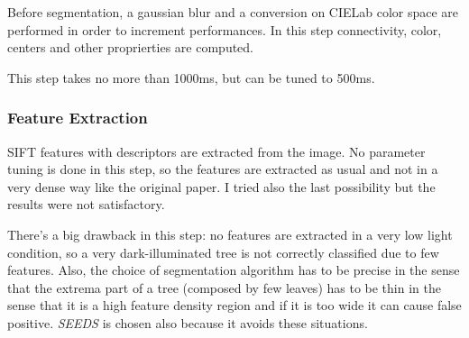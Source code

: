 \documentclass[a4paper,titlepaget]{article}
\begin{document}
Before segmentation, a gaussian blur and a conversion on CIELab color space are performed in order to increment performances. In this step connectivity, color, centers and other proprierties are computed.

This step takes no more than 1000ms, but can be tuned to 500ms.

\subsubsection{Feature Extraction}
SIFT features with descriptors are extracted from the image. No parameter tuning is done in this step, so the features are extracted as usual and not in a very dense way like the original paper. I tried also the last possibility but the results were not satisfactory. 

There's a big drawback in this step: no features are extracted in a very low light condition, so a very dark-illuminated tree is not correctly classified due to few features. Also, the choice of segmentation algorithm has to be precise in the sense that the extrema part of a tree (composed by few leaves) has to be thin in the sense that it is a high feature density region and if it is too wide it can cause false positive. \emph{SEEDS} is chosen also because it avoids these situations.
\end{document}
